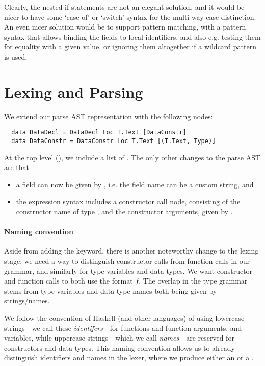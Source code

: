 Clearly, the nested if-statements are not an elegant solution, and it would be
nicer to have some `case of' or `switch' syntax for the multi-way case
distinction.
An even nicer solution would be to support pattern matching, with a pattern
syntax that allows binding the fields to local identifiers, and also e.g.
testing them for equality with a given value, or ignoring them altogether if
a wildcard pattern is used.



\section{Lexing and Parsing} \label{sec:ext-parsing}

We extend our parse AST representation with the following nodes:
\begin{verbatim}
  data DataDecl = DataDecl Loc T.Text [DataConstr]
  data DataConstr = DataConstr Loc T.Text [(T.Text, Type)]
\end{verbatim}
%
At the top level (), we include a list of .
The only other changes to the parse AST are that
\begin{itemize}
  \item a field can now be given by , i.e. the field
        name can be a custom string, and
  \item the expression syntax includes a constructor call node, consisting of
        the constructor name of type , and the constructor
        arguments, given by \haskell{[Expr]}.
\end{itemize}

\paragraph{Naming convention}
Aside from adding the  keyword, there is another noteworthy change to
the lexing stage: we need a way to distinguish constructor calls from function
calls in our grammar, and similarly for type variables and data types.
We want constructor and function calls to both use the format
$f$. The overlap in the type grammar stems from type variables
and data type names both being given by strings/names.

We follow the convention of Haskell (and other languages) of using lowercase
strings---we call these \emph{identifers}---for functions and function
arguments, and variables, while uppercase strings---which we call
\emph{names}---are reserved for constructors and data types.
This naming convention allows us to already distinguish identifiers and
names in the lexer, where we produce either an  or a
.

